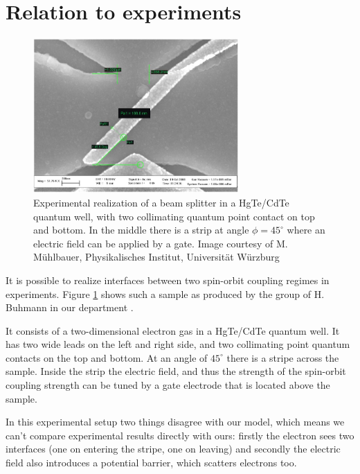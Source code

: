 \section{Relation to experiments}

\begin{figure}[htb]
    \begin{center}
        \includegraphics[width=0.7\textwidth]{beamsplitter2.jpg}
    \end{center}
    \caption{Experimental realization of a beam splitter in a HgTe/CdTe quantum
        well, with two
        collimating quantum point contact on top and bottom. In the middle
        there is a strip at angle $\phi = 45^\circ$ where an electric field
        can be applied by a gate. Image courtesy of M. Mühlbauer,
        Physikalisches Institut, Universität Würzburg\cite{mathias}}
    \label{fig:experiment}
\end{figure}

It is possible to realize interfaces between two spin-orbit coupling regimes
in experiments. Figure \ref{fig:experiment} shows such a sample as produced
by the group of H. Buhmann in our department \cite{mathias}.

It consists of a two-dimensional electron gas in a HgTe/CdTe quantum well. It has
two wide leads on the left and right side, and two collimating point quantum
contacts on the top and bottom. At an angle of $45^{\circ}$ there is a stripe
across the sample. Inside the strip the electric field, and thus the strength
of the spin-orbit coupling strength can be tuned by a gate electrode that is
located above the sample.

In this experimental setup two things disagree with our model, which
means we can't compare experimental results directly with ours: firstly the
electron sees two interfaces (one on entering the stripe, one on leaving) and
secondly the electric field also introduces a potential barrier, which
scatters electrons too.

